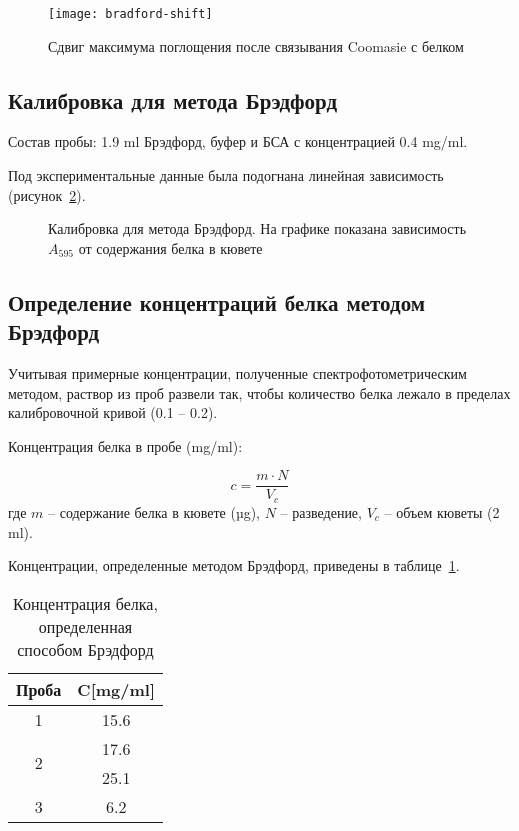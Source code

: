 \begin{figure}[htbp]
\texttt{[image: bradford-shift]}
\caption{Сдвиг максимума поглощения после связывания Coomasie с белком}
\label{fig-shift}
\end{figure}

\subsection{Калибровка для метода Брэдфорд}
\label{A0k}

Состав пробы: 1.9 ml Брэдфорд, буфер и БСА с концентрацией 0.4 mg/ml.

Под экспериментальные данные была подогнана линейная зависимость
(рисунок~\ref{fig-calibration}).

\begin{figure}[htbp]

\caption[Калибровка для метода Брэдфорд]
    {Калибровка для метода Брэдфорд.
    На графике показана зависимость $A_{595}$ от содержания белка в кювете}
\label{fig-calibration}
\end{figure}

\subsection{Определение концентраций белка методом Брэдфорд}

Учитывая примерные концентрации, полученные спектрофотометрическим методом,
раствор из проб развели так, чтобы количество белка лежало в пределах
калибровочной кривой (0.1 -- 0.2).

Концентрация белка в пробе (mg/ml):

$$ c = \frac{m \cdot N}{V_c} $$
где $m$ -- содержание белка в кювете (µg),
$N$ -- разведение,
$V_c$ -- объем кюветы (2 ml).

Концентрации, определенные методом Брэдфорд,
приведены в таблице~\ref{table-bredford}.

\begin{table}[htbp]
\caption{Концентрация белка, определенная способом Брэдфорд}
\begin{tabular}{|c|c|}
\hline
Проба & C[mg/ml] \\
\hline
1 & 15.6 \\
\hline
\multirow{2}{*}{2} & 17.6 \\
& 25.1 \\
\hline
3 & 6.2 \\
\hline
\end{tabular}
\label{table-bredford}
\end{table}

